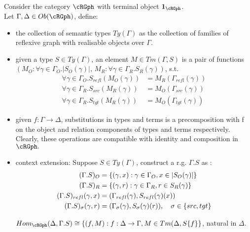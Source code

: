 \documentclass[12pt,a4paper]{article}
\def\src{_{src}}
\def\rfl{_{refl}}
\def\tgt{_{tgt}}
\renewcommand{\O}{_{O}}\alwaysmath{O}
\newcommand{\R}{\ensuremath{_{R}}}
\def\asmrg{reflexive graph with realisable objects\xspace}
\begin{document}
Consider the category $\cRGph$ with terminal object $\terminal{\cRGph}$.\\
Let $\Gamma, \Delta \in \ob\cRGph$, define: 
\begin{itemize}[noitemsep]
  \item the collection of semantic types $Ty(\Gamma)$ as the collection of families of \asmrg over $\Gamma$.
  
  \item given a type $S \in Ty(\Gamma)$, an element $M \in Tm(\Gamma, S)$ is a pair of functions\\ $({M\O : \forall \gamma \in \Gamma\O. |S\O(\gamma)|,\, M\R : \forall \gamma \in \Gamma\R. S\R(\gamma)})$, s.t. 
  \begin{align*}
    \forall \gamma \in \Gamma\O. {S\rfl} (M\O(\gamma)) &= M\R(\Gamma\rfl(\gamma))\\
    \forall \gamma \in \Gamma\R. {S\src} (M\R(\gamma)) &= M\O(\Gamma\src(\gamma))\\
    \forall \gamma \in \Gamma\R. {S\tgt} (M\R(\gamma)) &= M\O(\Gamma\tgt(\gamma))
  \end{align*}
  
  \item given $f : \Gamma \to \Delta$, substitutions in types and terms is a precomposition with f on the object and relation components of types and terms respectively. Clearly, these operations are compatible with identity and composition in $\cRGph.$
  
  \item context extension: Suppose $S \in Ty(\Gamma)$, construct a r.g. $\Gamma.S$ as :
  \begin{align*}
    (\Gamma.S)\O &= \{(\gamma, x) : \gamma \in \Gamma\O, x \in \carr{S\O(\gamma)}\}\\
    (\Gamma.S)\R &= \{(\gamma, r) : \gamma \in \Gamma\R, r \in S\R(\gamma)\}\\
    (\Gamma.S)\rfl(\gamma, x) &= (\Gamma\rfl(\gamma), S\rfl(\gamma)(x))\\
    (\Gamma.S)_\sigma(\gamma, r) &= (\Gamma_\sigma(\gamma), S_\sigma(\gamma)(r)),\quad \sigma \in \{src, tgt\}
  \end{align*}
  \begin{claim}
    $Hom_{\cRGph}(\Delta, \Gamma.S) \cong \{(f,M): f : \Delta \to \Gamma, M \in Tm(\Delta, S\{f\}\}$, natural in $\Delta$.
  \end{claim}
  

\end{itemize}
\end{document}
